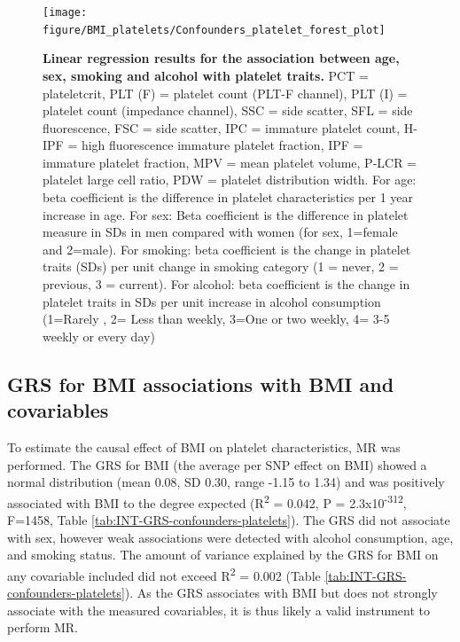 \documentclass[11pt,twoside]{bristolthesis}
\begin{document}
\begin{figure}
\texttt{[image: figure/BMI\_platelets/Confounders\_platelet\_forest\_plot]} \caption[Linear regression results for the association between age, sex, smoking and alcohol with platelet traits]{\textbf{Linear regression results for the association between age, sex, smoking and alcohol with platelet traits.} PCT = plateletcrit, PLT (F) = platelet count (PLT-F channel), PLT (I) = platelet count (impedance channel), SSC = side scatter, SFL = side fluorescence, FSC = side scatter, IPC = immature platelet count, H-IPF = high fluorescence immature platelet fraction, IPF = immature platelet fraction, MPV = mean platelet volume, P-LCR = platelet large cell ratio, PDW = platelet distribution width. For age: beta coefficient is the difference in platelet characteristics per 1 year increase in age. For sex: Beta coefficient is the difference in platelet measure in SDs in men compared with women (for sex, 1=female and 2=male). For smoking: beta coefficient is the change in platelet traits (SDs) per unit change in smoking category (1 = never, 2 = previous, 3 = current). For alcohol: beta coefficient is the change in platelet traits in SDs per unit increase in alcohol consumption (1=Rarely , 2= Less than weekly, 3=One or two weekly, 4= 3-5 weekly or every day)}\label{fig:confounder-platelets}
\end{figure}
\hypertarget{grs-for-bmi-associations-with-bmi-and-covariables}{%
\subsection{GRS for BMI associations with BMI and covariables}\label{grs-for-bmi-associations-with-bmi-and-covariables}}

To estimate the causal effect of BMI on platelet characteristics, MR was performed. The GRS for BMI (the average per SNP effect on BMI) showed a normal distribution (mean 0.08, SD 0.30, range -1.15 to 1.34) and was positively associated with BMI to the degree expected (R\textsuperscript{2} = 0.042, P = 2.3x10\textsuperscript{-312}, F=1458, Table \ref{tab:INT-GRS-confounders-platelets}). The GRS did not associate with sex, however weak associations were detected with alcohol consumption, age, and smoking status. The amount of variance explained by the GRS for BMI on any covariable included did not exceed R\textsuperscript{2} = 0.002 (Table \ref{tab:INT-GRS-confounders-platelets}). As the GRS associates with BMI but does not strongly associate with the measured covariables, it is thus likely a valid instrument to perform MR.
\end{document}
